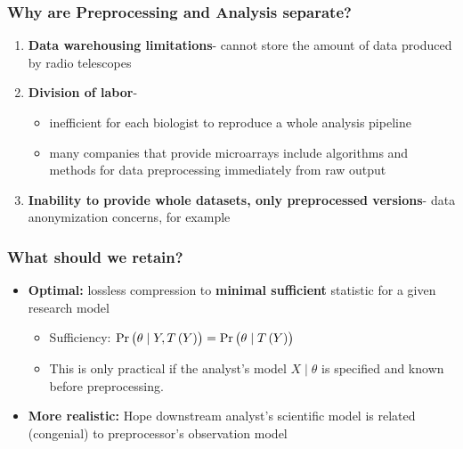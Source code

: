 \documentclass[10pt, compress]{beamer}
\begin{document}
\begin{frame}[fragile]
    \frametitle{Why are Preprocessing and Analysis separate?}
    
    \begin{enumerate} 
    \item \textbf{Data warehousing limitations}- cannot store the amount of data produced by radio telescopes
    \vspace*{3mm}
    \item \textbf{Division of labor}- 
        \begin{itemize}
        \item inefficient for each biologist to reproduce a whole analysis pipeline 
        \item many companies that provide microarrays include algorithms and methods for data preprocessing immediately from raw output
        \end{itemize}
    \vspace*{3mm}
    \item \textbf{Inability to provide whole datasets, only preprocessed versions}- data anonymization concerns, for example
    \end{enumerate}

\end{frame}

\begin{frame}[fragile]
    \frametitle{What should we retain?}
    \begin{itemize}
        \item \textbf{Optimal:} lossless compression to \textbf{minimal sufficient} statistic for a given research model
            \begin{itemize}
                \item Sufficiency: $\Pr\del{\theta \mid Y,T\del{Y}}=\Pr\del{\theta \mid T\del{Y}}$
                \item This is only practical if the analyst's model $X \mid \theta$ is specified and known before preprocessing.
            \end{itemize}
        \item \textbf{More realistic:} Hope downstream analyst's scientific model is related (congenial) to preprocessor's observation model
    \end{itemize}
\end{frame}
\end{document}

